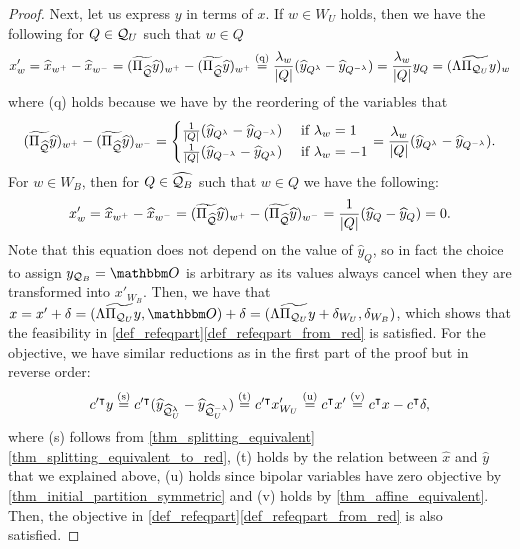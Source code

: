 \documentclass[pdflatex,sn-mathphys-num]{sn-jnl}%
\theoremstyle{thmstyleone}%
\theoremstyle{thmstylethree}%
\theoremstyle{thmstyletwo}%
\begin{document}
\begin{proof}
    Next, let us express $y$ in terms of $x$. If $w\in W_U$ holds, then we have the following for $Q\in \mathcal{Q}_U$ such that $w\in Q$
    \begin{equation*}
        x'_w = \widehat{x}_{w^+} - \widehat{x}_{w^-} = (\widetilde{\Pi_{\widehat{\mathcal{Q}}}} \widehat{y})_{w^+} - (\widetilde{\Pi_{\widehat{\mathcal{Q}}}} \widehat{y})_{w^+} \stackrel{\textup{(q)}}{=} \frac{\lambda_w}{|Q|} (\widehat{y}_{Q^\lambda} - \widehat{y}_{Q^{-\lambda}}) = \frac{\lambda_w}{|Q|} y_Q = (\Lambda \widetilde{\Pi_{\mathcal{Q}_U}} y)_w  
    \end{equation*}
    where \textup{(q)} holds because we have by the reordering of the variables that
    \begin{equation*}
        (\widetilde{\Pi_{\widehat{\mathcal{Q}}}} \widehat{y})_{w^+} - (\widetilde{\Pi_{\widehat{\mathcal{Q}}}} \widehat{y})_{w^-} = \begin{cases}
            \frac{1}{|Q|} (\widehat{y}_{Q^\lambda} - \widehat{y}_{Q^{-\lambda}}) &\text{ if $\lambda_w = 1$}\\
            \frac{1}{|Q|} (\widehat{y}_{Q^{-\lambda}} - \widehat{y}_{Q^{\lambda}}) &\text{ if $\lambda_w = -1$}
        \end{cases} = \frac{\lambda_w}{|Q|} (\widehat{y}_{Q^\lambda} - \widehat{y}_{Q^{-\lambda}}).
    \end{equation*}
    For $w\in W_B$, then for $Q \in \widehat{\mathcal{Q}_B}$ such that $w\in Q$ we have the following:
    \begin{equation*}
        x'_w = \widehat{x}_{w^+} - \widehat{x}_{w^-} = (\widetilde{\Pi_{\widehat{\mathcal{Q}}}} \widehat{y})_{w^+} - (\widetilde{\Pi_{\widehat{\mathcal{Q}}}} \widehat{y})_{w^-} = \frac{1}{|Q|}(\widehat{y}_{Q} - \widehat{y}_{Q}) = 0.
    \end{equation*}
    Note that this equation does not depend on the value of $\widehat{y}_Q$, so in fact the choice to assign $y_{\MQ_B} = \zerovec$ is arbitrary as its values always cancel when they are transformed into $x'_{W_B}$.
    Then, we have that $x = x' + \delta = (\Lambda \widetilde{\Pi_{\MQ_U}} y,\zerovec) + \delta = (\Lambda \widetilde{\Pi_{\MQ_U}} y + \delta_{W_U},\delta_{W_B})$, which shows that the feasibility in \cref{def_refeqpart}\ref{def_refeqpart_from_red} is satisfied.
    For the objective, we have similar reductions as in the first part of the proof but in reverse order:
     \begin{align*}
        c'^{\intercal}y \stackrel{\textup{(s)}}= c'^{\intercal}(\widehat{y}_{\widehat{\mathcal{Q}}^{\lambda}_U} - \widehat{y}_{\widehat{\mathcal{Q}}^{-\lambda}_U}) \stackrel{\textup{(t)}}= c'^{\intercal} x'_{W_U} \stackrel{\textup{(u)}}= c^{\intercal} x' \stackrel{\textup{(v)}}=
        c^{\intercal} x - c^{\intercal} \delta,
    \end{align*}
    where \textup{(s)} follows from \cref{thm_splitting_equivalent}\ref{thm_splitting_equivalent_to_red}, \textup{(t)} holds by the relation between $\widehat{x}$ and $\widehat{y}$ that we explained above, \textup{(u)} holds since bipolar variables have zero objective by \cref{thm_initial_partition_symmetric} and \textup{(v)} holds by \cref{thm_affine_equivalent}. Then, the objective in \cref{def_refeqpart}\ref{def_refeqpart_from_red} is also satisfied.
    

\end{proof}
\end{document}
